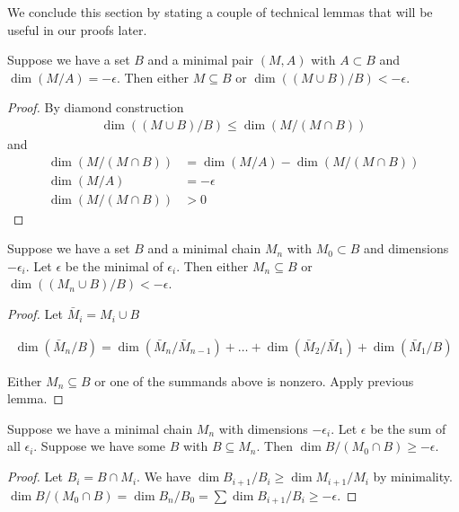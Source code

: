 \documentclass{amsart}
\begin{document}
We conclude this section by stating a couple of technical lemmas that will be useful in our proofs later.
\begin{Lemma}
  Suppose we have a set $B$ and a minimal pair $(M, A)$ with $A \subset B$ and $\dim(M/A) = -\epsilon$.
  Then either $M \subseteq B$ or $\dim((M \cup B)/B) < -\epsilon$.
\end{Lemma}

\begin{proof}
  By diamond construction
  \begin{align*}
    \dim((M \cup B)/B) \leq \dim(M / (M \cap B))
  \end{align*}
  and 
  \begin{align*}
    \dim(M / (M \cap B)) &= \dim (M/A) - \dim(M / (M \cap B)) \\
    \dim (M/A) &= -\epsilon \\
    \dim(M / (M \cap B)) &> 0
  \end{align*}
\end{proof}



\begin{Lemma}	\label{chain_lemma}
  Suppose we have a set $B$ and a minimal chain $M_n$ with $M_0 \subset B$ and dimensions $-\epsilon_i$.
  Let $\epsilon$ be the minimal of $\epsilon_i$.
  Then either $M_n \subseteq B$ or $\dim((M_n \cup B)/B) < -\epsilon$.
\end{Lemma}


\begin{proof}
  Let $\bar M_i = M_i \cup B$

  \begin{align*}
    \dim(\bar M_n/B) = \dim(\bar M_n/\bar M_{n-1}) + \ldots + \dim(\bar M_2/\bar M_1) + \dim(\bar M_1/B)
  \end{align*}

  Either $M_n \subseteq B$ or one of the summands above is nonzero.
  Apply previous lemma.
\end{proof}

\begin{Lemma} \label{chain_intersect}
  Suppose we have a minimal chain $M_n$ with dimensions $-\epsilon_i$.
  Let $\epsilon$ be the sum of all $\epsilon_i$.
  Suppose we have some $B$ with $B \subseteq M_n$.
  Then $\dim B / (M_0 \cap B) \geq -\epsilon$.
\end{Lemma}

\begin{proof}
  Let $B_i = B \cap M_i$.
  We have $\dim B_{i+1}/B_i \geq \dim M_{i+1}/M_i$ by minimality.
  $\dim B / (M_0 \cap B) = \dim B_n / B_0 = \sum \dim B_{i+1}/B_i \geq -\epsilon$.
\end{proof}
\end{document}
